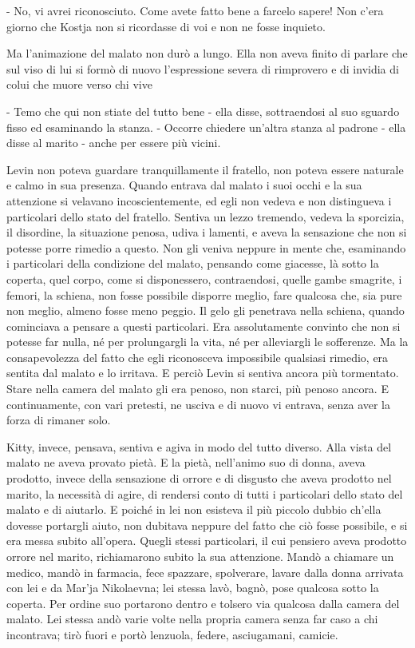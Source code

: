 - No, vi avrei riconosciuto. Come avete fatto bene a farcelo sapere! Non c'era giorno che Kostja non si ricordasse di voi e non ne fosse inquieto. 

Ma l'animazione del malato non durò a lungo. Ella non aveva finito di parlare che sul viso di lui si formò di nuovo l'espressione severa di rimprovero e di invidia di colui che muore verso chi vive 

- Temo che qui non stiate del tutto bene - ella disse, sottraendosi al suo sguardo fisso ed esaminando la stanza. - Occorre chiedere un'altra stanza al padrone - ella disse al marito - anche per essere più vicini. 

\label{xviii-4} 

Levin non poteva guardare tranquillamente il fratello, non poteva essere naturale e calmo in sua presenza. Quando entrava dal malato i suoi occhi e la sua attenzione si velavano incoscientemente, ed egli non vedeva e non distingueva i particolari dello stato del fratello. Sentiva un lezzo tremendo, vedeva la sporcizia, il disordine, la situazione penosa, udiva i lamenti, e aveva la sensazione che non si potesse porre rimedio a questo. Non gli veniva neppure in mente che, esaminando i particolari della condizione del malato, pensando come giacesse, là sotto la coperta, quel corpo, come si disponessero, contraendosi, quelle gambe smagrite, i femori, la schiena, non fosse possibile disporre meglio, fare qualcosa che, sia pure non meglio, almeno fosse meno peggio. Il gelo gli penetrava nella schiena, quando cominciava a pensare a questi particolari. Era assolutamente convinto che non si potesse far nulla, né per prolungargli la vita, né per alleviargli le sofferenze. Ma la consapevolezza del fatto che egli riconosceva impossibile qualsiasi rimedio, era sentita dal malato e lo irritava. E perciò Levin si sentiva ancora più tormentato. Stare nella camera del malato gli era penoso, non starci, più penoso ancora. E continuamente, con vari pretesti, ne usciva e di nuovo vi entrava, senza aver la forza di rimaner solo. 

Kitty, invece, pensava, sentiva e agiva in modo del tutto diverso. Alla vista del malato ne aveva provato pietà. E la pietà, nell'animo suo di donna, aveva prodotto, invece della sensazione di orrore e di disgusto che aveva prodotto nel marito, la necessità di agire, di rendersi conto di tutti i particolari dello stato del malato e di aiutarlo. E poiché in lei non esisteva il più piccolo dubbio ch'ella dovesse portargli aiuto, non dubitava neppure del fatto che ciò fosse possibile, e si era messa subito all'opera. Quegli stessi particolari, il cui pensiero aveva prodotto orrore nel marito, richiamarono subito la sua attenzione. Mandò a chiamare un medico, mandò in farmacia, fece spazzare, spolverare, lavare dalla donna arrivata con lei e da Mar'ja Nikolaevna; lei stessa lavò, bagnò, pose qualcosa sotto la coperta. Per ordine suo portarono dentro e tolsero via qualcosa dalla camera del malato. Lei stessa andò varie volte nella propria camera senza far caso a chi incontrava; tirò fuori e portò lenzuola, federe, asciugamani, camicie. 

